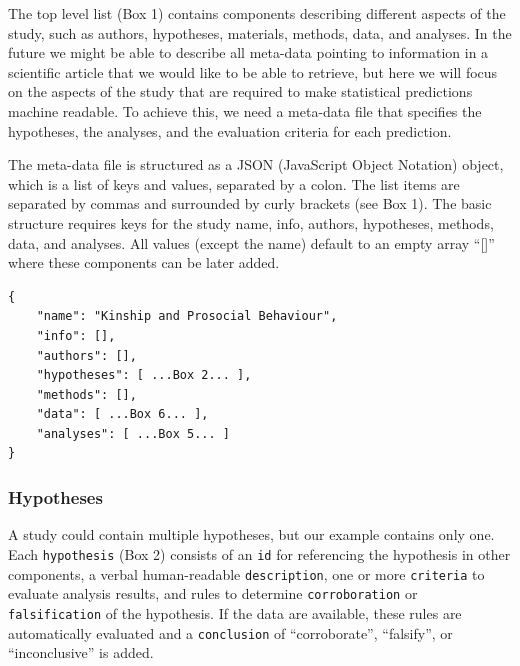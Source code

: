 \documentclass[
  english,
  doc,floatsintext]{apa6}
\begin{document}
The top level list (Box 1) contains components describing different aspects of the study, such as authors, hypotheses, materials, methods, data, and analyses. In the future we might be able to describe all meta-data pointing to information in a scientific article that we would like to be able to retrieve, but here we will focus on the aspects of the study that are required to make statistical predictions machine readable. To achieve this, we need a meta-data file that specifies the hypotheses, the analyses, and the evaluation criteria for each prediction.

The meta-data file is structured as a JSON (JavaScript Object Notation) object, which is a list of keys and values, separated by a colon. The list items are separated by commas and surrounded by curly brackets (see Box 1). The basic structure requires keys for the study name, info, authors, hypotheses, methods, data, and analyses. All values (except the name) default to an empty array \enquote{{[}{]}} where these components can be later added.

\begin{tcolorbox}[colback=black!5!white,colframe=white!5!black,title=Box 1. The top-level structure of the machine-readable study description.]
\begin{verbatim}
{
    "name": "Kinship and Prosocial Behaviour",
    "info": [],
    "authors": [],
    "hypotheses": [ ...Box 2... ],
    "methods": [],
    "data": [ ...Box 6... ],
    "analyses": [ ...Box 5... ]
}
\end{verbatim}
\end{tcolorbox}

\hypertarget{hypotheses}{%
\subsubsection{Hypotheses}\label{hypotheses}}

A study could contain multiple hypotheses, but our example contains only one. Each \texttt{hypothesis} (Box 2) consists of an \texttt{id} for referencing the hypothesis in other components, a verbal human-readable \texttt{description}, one or more \texttt{criteria} to evaluate analysis results, and rules to determine \texttt{corroboration} or \texttt{falsification} of the hypothesis. If the data are available, these rules are automatically evaluated and a \texttt{conclusion} of \enquote{corroborate}, \enquote{falsify}, or \enquote{inconclusive} is added.
\end{document}
